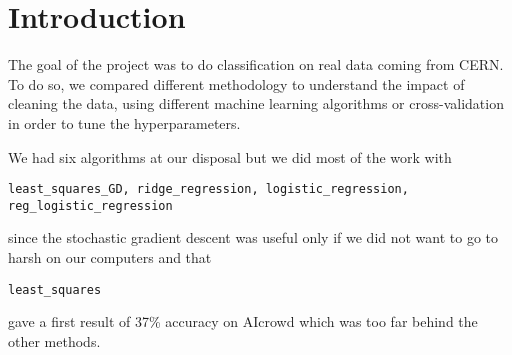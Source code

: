 \documentclass[../proj1_report.tex]{subfiles}
\begin{document}
\section{Introduction}
The goal of the project was to do classification on real data coming from CERN. To do so, we compared different methodology to understand the impact of cleaning the data, using different machine learning algorithms or cross-validation in order to tune the hyperparameters.

We had six algorithms at our disposal but we did most of the work with 
\begin{lstlisting}
least_squares_GD, ridge_regression, logistic_regression, reg_logistic_regression
\end{lstlisting}
since the stochastic gradient descent was useful only if we did not want to go to harsh on our computers and that
\begin{lstlisting}
least_squares
\end{lstlisting}
gave a first result of 37\% accuracy on AIcrowd which was too far behind the other methods.
\end{document}
